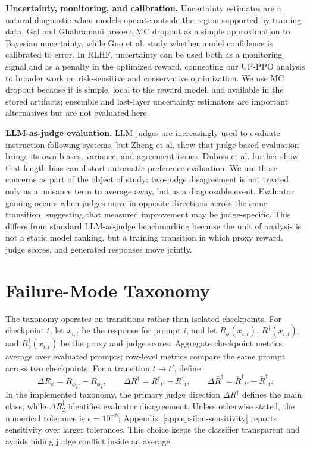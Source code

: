 \documentclass[11pt]{article}
\newcommand{\Rphi}{R_{\phi}}
\newcommand{\Rdag}{R^{\dagger}}
\newcommand{\Rtwo}{R^{\dagger}_2}
\newcommand{\Rbar}{\bar R^{\dagger}}
\newcommand{\delt}{\Delta}
\begin{document}
\textbf{Uncertainty, monitoring, and calibration.} Uncertainty estimates are a natural diagnostic when models operate outside the region supported by training data. Gal and Ghahramani \cite{gal2016dropout} present MC dropout as a simple approximation to Bayesian uncertainty, while Guo et al. \cite{guo2017calibration} study whether model confidence is calibrated to error. In RLHF, uncertainty can be used both as a monitoring signal and as a penalty in the optimized reward, connecting our UP-PPO analysis to broader work on risk-sensitive and conservative optimization. We use MC dropout because it is simple, local to the reward model, and available in the stored artifacts; ensemble and last-layer uncertainty estimators are important alternatives but are not evaluated here.

\textbf{LLM-as-judge evaluation.} LLM judges are increasingly used to evaluate instruction-following systems, but Zheng et al. \cite{zheng2023judging} show that judge-based evaluation brings its own biases, variance, and agreement issues. Dubois et al. \cite{dubois2024length} further show that length bias can distort automatic preference evaluation. We use those concerns as part of the object of study: two-judge disagreement is not treated only as a nuisance term to average away, but as a diagnosable event. Evaluator gaming occurs when judges move in opposite directions across the same transition, suggesting that measured improvement may be judge-specific. This differs from standard LLM-as-judge benchmarking because the unit of analysis is not a static model ranking, but a training transition in which proxy reward, judge scores, and generated responses move jointly.

\section{Failure-Mode Taxonomy}
The taxonomy operates on transitions rather than isolated checkpoints. For checkpoint $t$, let $x_{i,t}$ be the response for prompt $i$, and let $\Rphi(x_{i,t})$, $\Rdag(x_{i,t})$, and $\Rtwo(x_{i,t})$ be the proxy and judge scores. Aggregate checkpoint metrics average over evaluated prompts; row-level metrics compare the same prompt across two checkpoints. For a transition $t\to t'$, define
\begin{equation}
\delt \Rphi = {\Rphi}_{t'}-{\Rphi}_t,\qquad
\delt \Rdag = {\Rdag}_{t'}-{\Rdag}_t,\qquad
\delt \Rbar = {\Rbar}_{t'}-{\Rbar}_t.
\end{equation}
In the implemented taxonomy, the primary judge direction $\delt \Rdag$ defines the main class, while $\delt \Rtwo$ identifies evaluator disagreement. Unless otherwise stated, the numerical tolerance is $\epsilon=10^{-8}$; Appendix~\ref{app:epsilon-sensitivity} reports sensitivity over larger tolerances. This choice keeps the classifier transparent and avoids hiding judge conflict inside an average.
\end{document}
